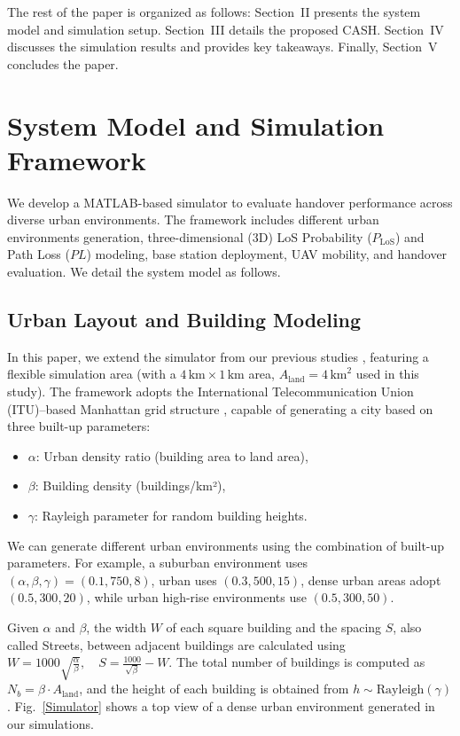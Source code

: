 \documentclass[conference]{IEEEtran}
\begin{document}
The rest of the paper is organized as follows: Section~II presents the system model and simulation setup. Section~III details the proposed CASH. Section~IV discusses the simulation results and provides key takeaways. Finally, Section~V concludes the paper.


\section{System Model and Simulation Framework}
We develop a MATLAB-based simulator to evaluate handover performance across diverse urban environments. The framework includes different urban environments generation, three-dimensional (3D) LoS Probability ($P_{\mathrm{LoS}}$) and  Path Loss ($PL$) modeling, base station deployment, UAV mobility, and handover evaluation. We detail the system model as follows. 

\subsection{Urban Layout and Building Modeling}
In this paper, we extend the simulator from our previous studies \cite{saboorEUCAP, saboorWCNC}, featuring a flexible simulation area (with a $4\,\mathrm{km} \times 1\,\mathrm{km}$ area, $A_{\text{land}} = 4\,\mathrm{km}^2$ used in this study). The framework adopts the International Telecommunication Union (ITU)--based Manhattan grid structure \cite{ITU}, capable of generating a city based on three built-up parameters:



\begin{itemize}
    \item $\alpha$: Urban density ratio (building area to land area),
    \item \(\beta\): Building density (buildings/km²),
    \item \(\gamma\): Rayleigh parameter for random building heights.
\end{itemize}

We can generate different urban environments using the combination of built-up parameters. For example, a suburban environment uses $(\alpha, \beta, \gamma) = (0.1, 750, 8)$, urban uses $(0.3, 500, 15)$, dense urban areas adopt $(0.5, 300, 20)$, while urban high-rise environments use $(0.5, 300, 50)$.

Given $\alpha$ and $\beta$, the width $W$ of each square building and the spacing $S$, also called Streets, between adjacent buildings are calculated using $W = 1000 \sqrt{\frac{\alpha}{\beta}}, \quad S = \frac{1000}{\sqrt{\beta}} - W$. The total number of buildings is computed as $N_b = \beta \cdot A_{\text{land}}$, and the height of each building is obtained from $h \sim \text{Rayleigh}(\gamma)$. Fig.~\ref{Simulator} shows a top view of a dense urban environment generated in our simulations.
\end{document}
